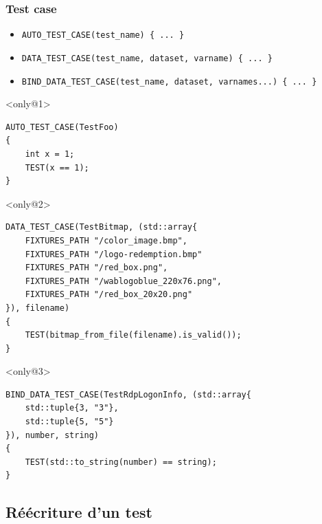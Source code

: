 \documentclass{beamer}
\begin{document}
\begin{frame}[fragile]
\frametitle{Test case}

\begin{itemize}[<+->]
 \item \lstinline|AUTO_TEST_CASE(test_name) { ... }|
 \item \lstinline|DATA_TEST_CASE(test_name, dataset, varname) { ... }|
 \item \lstinline|BIND_DATA_TEST_CASE(test_name, dataset, varnames...) { ... }|
\end{itemize}

\begin{exampleblock}{}<only@1>
\begin{lstlisting}
AUTO_TEST_CASE(TestFoo)
{
    int x = 1;
    TEST(x == 1);
}
\end{lstlisting}
\end{exampleblock}

\begin{exampleblock}{}<only@2>
\begin{lstlisting}
DATA_TEST_CASE(TestBitmap, (std::array{
    FIXTURES_PATH "/color_image.bmp",
    FIXTURES_PATH "/logo-redemption.bmp"
    FIXTURES_PATH "/red_box.png",
    FIXTURES_PATH "/wablogoblue_220x76.png",
    FIXTURES_PATH "/red_box_20x20.png"
}), filename)
{
    TEST(bitmap_from_file(filename).is_valid());
}
\end{lstlisting}
\end{exampleblock}

\begin{exampleblock}{}<only@3>
\begin{lstlisting}
BIND_DATA_TEST_CASE(TestRdpLogonInfo, (std::array{
    std::tuple{3, "3"},
    std::tuple{5, "5"}
}), number, string)
{
    TEST(std::to_string(number) == string);
}
\end{lstlisting}
\end{exampleblock}
\end{frame}


\subsection{Réécriture d'un test}
\end{document}
